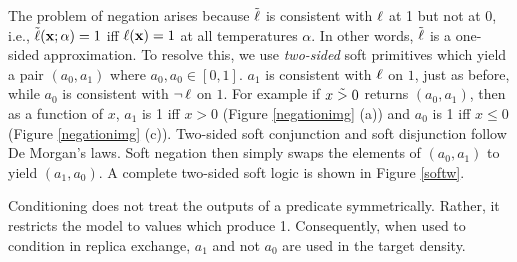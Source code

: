 The problem of negation arises because $\mathrel{\tilde{\operatorname{\ell}}}$ is consistent with $\operatorname{\ell}$ at 1 but not at 0, i.e., $\tilde{\operatorname{\ell}}(\mathbf{x}; \alpha) = 1$ iff $\operatorname{\ell}(\mathbf{x}) = 1$ at all temperatures $\alpha$.
In other words, $\mathrel{\tilde{\operatorname{\ell}}}$ is a one-sided approximation.
To resolve this, we use \emph{two-sided} soft primitives which yield a pair $(a_0, a_1)$ where $a_0, a_0 \in [0, 1]$.
$a_1$ is consistent with $\operatorname{\ell}$ on $1$, just as before, while $a_0$ is consistent with $\neg \operatorname{\ell}$ on $1$.
For example if $x \mathrel{\tilde{>}} 0$ returns $(a_0, a_1)$, then as a function of $x$, $a_1$ is 1 iff $x > 0$ (Figure \ref{negationimg} (a)) and $a_0$ is 1 iff $x \leq 0$ (Figure \ref{negationimg} (c)).
Two-sided soft conjunction and soft disjunction follow De Morgan's laws.
Soft negation then simply swaps the elements of $(a_0, a_1)$ to yield $(a_1, a_0)$.
A complete two-sided soft logic is shown in Figure \ref{softw}.

Conditioning does not treat the outputs of a predicate symmetrically.
Rather, it restricts the model to values which produce 1.
Consequently, when used to condition in replica exchange, $a_1$ and not $a_0$ are used in the target density.



